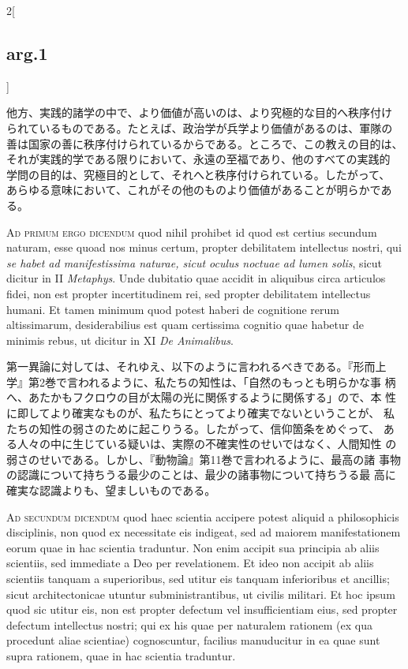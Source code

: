 \documentclass[
paper=a4paper,
fontsize=10pt,
jafontsize=9pt,
titlepage
]{jlreq}
\begin{document}
\begin{paracol}{2}[\subsection{arg.1}]
\switchcolumn

他方、実践的諸学の中で、より価値が高いのは、より究極的な目的へ秩序付け
られているものである。たとえば、政治学が兵学より価値があるのは、軍隊の
善は国家の善に秩序付けられているからである。ところで、この教えの目的は、
それが実践的学である限りにおいて、永遠の至福であり、他のすべての実践的
学問の目的は、究極目的として、それへと秩序付けられている。したがって、
あらゆる意味において、これがその他のものより価値があることが明らかであ
る。

\switchcolumn*[\subsection{ad.1}]

{\scshape Ad primum ergo dicendum} quod nihil prohibet id quod est
certius secundum naturam, esse quoad nos minus certum, propter
debilitatem intellectus nostri, qui {\itshape se habet ad
manifestissima naturae, sicut oculus noctuae ad lumen solis}, sicut
dicitur in II {\itshape Metaphys}. Unde dubitatio quae accidit in
aliquibus circa articulos fidei, non est propter incertitudinem rei,
sed propter debilitatem intellectus humani. Et tamen minimum quod
potest haberi de cognitione rerum altissimarum, desiderabilius est
quam certissima cognitio quae habetur de minimis rebus, ut dicitur in
XI {\itshape De Animalibus}.

\switchcolumn

第一異論に対しては、それゆえ、以下のように言われるべきである。『形而上
学』第2巻で言われるように、私たちの知性は、「自然のもっとも明らかな事
柄へ、あたかもフクロウの目が太陽の光に関係するように関係する」ので、本
性に即してより確実なものが、私たちにとってより確実でないということが、
私たちの知性の弱さのために起こりうる。したがって、信仰箇条をめぐって、
ある人々の中に生じている疑いは、実際の不確実性のせいではなく、人間知性
の弱さのせいである。しかし、『動物論』第11巻で言われるように、最高の諸
事物の認識について持ちうる最少のことは、最少の諸事物について持ちうる最
高に確実な認識よりも、望ましいものである。

\switchcolumn*[\subsection{ad.2}]

{\scshape Ad secundum dicendum} quod haec scientia accipere potest
aliquid a philosophicis disciplinis, non quod ex necessitate eis
indigeat, sed ad maiorem manifestationem eorum quae in hac scientia
traduntur. Non enim accipit sua principia ab aliis scientiis, sed
immediate a Deo per revelationem. Et ideo non accipit ab aliis
scientiis tanquam a superioribus, sed utitur eis tanquam inferioribus
et ancillis; sicut architectonicae utuntur subministrantibus, ut
civilis militari. Et hoc ipsum quod sic utitur eis, non est propter
defectum vel insufficientiam eius, sed propter defectum intellectus
nostri; qui ex his quae per naturalem rationem (ex qua procedunt aliae
scientiae) cognoscuntur, facilius manuducitur in ea quae sunt supra
rationem, quae in hac scientia traduntur.


\end{paracol}
\end{document}

